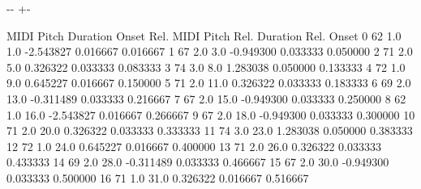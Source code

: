 \documentclass[letterpaper,10pt,english]{sphinxmanual}
\newlength\nbsphinxcodecellspacing
\begin{document}
{
\begin{sphinxVerbatim}[commandchars=\\\{\}]
\llap{\color{nbsphinxin}[251]:\,\hspace{\fboxrule}\hspace{\fboxsep}}
\end{sphinxVerbatim}
}

{

\kern-\sphinxverbatimsmallskipamount\kern-\baselineskip
\kern+\FrameHeightAdjust\kern-\fboxrule
\vspace{\nbsphinxcodecellspacing}

\begin{sphinxVerbatim}[commandchars=\\\{\}]
\llap{\color{nbsphinxout}[251]:\,\hspace{\fboxrule}\hspace{\fboxsep}}    MIDI Pitch  Duration  Onset  Rel. MIDI Pitch  Rel. Duration  Rel. Onset
0           62       1.0    1.0        -2.543827       0.016667    0.016667
1           67       2.0    3.0        -0.949300       0.033333    0.050000
2           71       2.0    5.0         0.326322       0.033333    0.083333
3           74       3.0    8.0         1.283038       0.050000    0.133333
4           72       1.0    9.0         0.645227       0.016667    0.150000
5           71       2.0   11.0         0.326322       0.033333    0.183333
6           69       2.0   13.0        -0.311489       0.033333    0.216667
7           67       2.0   15.0        -0.949300       0.033333    0.250000
8           62       1.0   16.0        -2.543827       0.016667    0.266667
9           67       2.0   18.0        -0.949300       0.033333    0.300000
10          71       2.0   20.0         0.326322       0.033333    0.333333
11          74       3.0   23.0         1.283038       0.050000    0.383333
12          72       1.0   24.0         0.645227       0.016667    0.400000
13          71       2.0   26.0         0.326322       0.033333    0.433333
14          69       2.0   28.0        -0.311489       0.033333    0.466667
15          67       2.0   30.0        -0.949300       0.033333    0.500000
16          71       1.0   31.0         0.326322       0.016667    0.516667

\end{sphinxVerbatim}}
\end{document}
